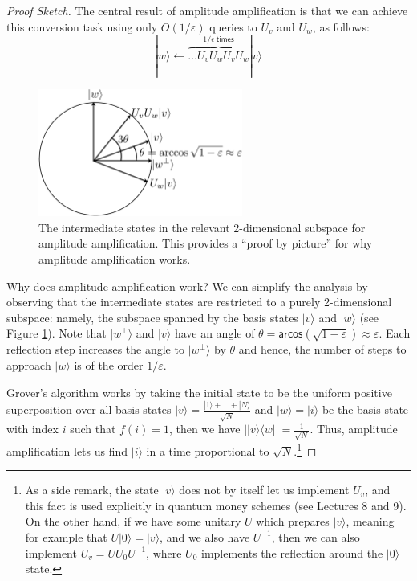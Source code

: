 \documentclass[11pt]{report}
\theoremstyle{plain}
\theoremstyle{definition}
\renewcommand{\ket}[1]{|#1\rangle}
\newcommand{\ketbra}[2]{|#1\rangle\!\langle#2|}
\begin{document}
\begin{proof}[Proof Sketch]
  The central result of amplitude amplification is that we can achieve this conversion task using only $O( 1/ \varepsilon)$ queries to $U_v$ and $U_w$, as follows:
$$
    \ket{w} \leftarrow \overbrace{\ldots U_v U_w U_v U_w}^{1 / \epsilon \;
    \mathsf{times}} \ket{v} $$

  \begin{figure}[h!]\label{fig:AmplitudAmplification}
  \begin{center}
\includegraphics[width=0.6\textwidth]{AmplitudeAmplification.pdf}
\caption{The intermediate states in the relevant 2-dimensional subspace for amplitude amplification.
This provides a ``proof by picture'' for why amplitude amplification works.}
\end{center}
\end{figure}
Why does amplitude amplification work?  We can simplify the analysis by observing that the intermediate states are restricted to a purely 2-dimensional subspace:
  namely, the subspace spanned by the basis states $\ket{ v }$ and $\ket{ w }$ (see Figure \ref{fig:AmplitudAmplification}).  Note that $\ket{ w^{\perp} }$ and $\ket {v }$ have an angle of $\theta = \mathsf{arcos} (\sqrt{1-\varepsilon})\approx \varepsilon$.
  Each reflection step increases the angle to $\ket{w^\perp}$ by $\theta$ and hence, the number of steps to approach $\ket{w}$ is of the order $1/\varepsilon$.

Grover's algorithm works by taking the initial state to be the uniform positive superposition over all basis states $\ket{ v } = \frac{\ket{1} +  \ldots + \ket{N}}{\sqrt{N}}$ and $\ket{w} = \ket{i}$ be the basis state with index $i$ such that $f (i) = 1$, then we have $| \ketbra{ v}{w } | =  \frac{1}{\sqrt{N}} $.
Thus, amplitude amplification lets us find $\ket{i}$ in a time proportional to $\sqrt{N}$.\footnote{As a side remark, the state $\ket{ v}$ does not by itself let us implement $U_v$, and
  this fact is used explicitly in quantum money schemes (see Lectures 8 and 9).
  On the other hand, if we  have some unitary $U$ which prepares $\ket{ v }$, meaning
  for example that $U \ket{ 0 } = \ket{ v }$, and we also have $U^{-1}$, then we can also implement $U_v = U U_0 U^{- 1}$, where $U_0$ implements the reflection around the $\ket{ 0 }$ state.}


\end{proof}
\end{document}
